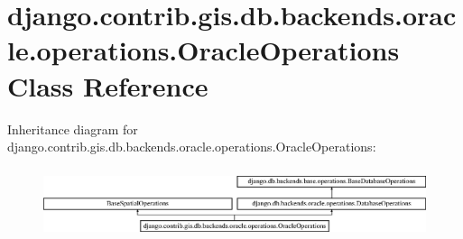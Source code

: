 \hypertarget{classdjango_1_1contrib_1_1gis_1_1db_1_1backends_1_1oracle_1_1operations_1_1_oracle_operations}{}\section{django.\+contrib.\+gis.\+db.\+backends.\+oracle.\+operations.\+Oracle\+Operations Class Reference}
\label{classdjango_1_1contrib_1_1gis_1_1db_1_1backends_1_1oracle_1_1operations_1_1_oracle_operations}
Inheritance diagram for django.\+contrib.\+gis.\+db.\+backends.\+oracle.\+operations.\+Oracle\+Operations\+:\begin{figure}[H]
\begin{center}
\leavevmode
\includegraphics[height=2.074074cm]{classdjango_1_1contrib_1_1gis_1_1db_1_1backends_1_1oracle_1_1operations_1_1_oracle_operations}
\end{center}
\end{figure}
